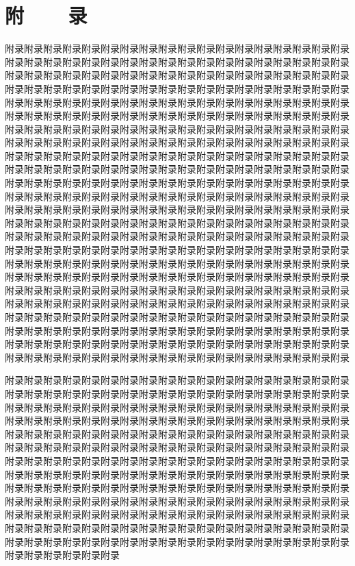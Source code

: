 \chapter*{附~~~~录}


附录附录附录附录附录附录附录附录附录附录附录附录附录附录附录附录附录附录附录附录附录附录附录附录附录附录附录附录附录附录附录附录附录附录附录附录附录附录附录附录附录附录附录附录附录附录附录附录附录附录附录附录附录附录附录附录附录附录附录附录附录附录附录附录附录附录附录附录附录附录附录附录附录附录附录附录附录附录附录附录附录附录附录附录附录附录附录附录附录附录附录附录附录附录附录附录附录附录附录附录附录附录附录附录附录附录附录附录附录附录附录附录附录附录附录附录附录附录附录附录附录附录附录附录附录附录附录附录附录附录附录附录附录附录附录附录附录附录附录附录附录附录附录附录附录附录附录附录附录附录附录附录附录附录附录附录附录附录附录附录附录附录附录附录附录附录附录附录附录附录附录附录附录附录附录附录附录附录附录附录附录附录附录附录附录附录附录附录附录附录附录附录附录附录附录附录附录附录附录附录附录附录附录附录附录附录附录附录附录附录附录附录附录附录附录附录附录附录附录附录附录附录附录附录附录附录附录附录附录附录附录附录附录附录附录附录附录附录附录附录附录附录附录附录附录附录附录附录附录附录附录附录附录附录附录附录附录附录附录附录附录附录附录附录附录附录附录附录附录附录附录附录附录附录附录附录附录附录附录附录附录附录附录附录附录附录附录附录附录附录附录附录附录附录附录附录附录附录附录附录附录附录附录附录附录附录附录附录附录附录附录附录附录附录附录附录附录附录附录附录附录附录附录附录附录附录附录附录附录附录附录附录附录附录附录附录附录附录附录附录附录附录附录附录附录附录附录附录附录附录附录附录附录附录附录附录附录附录附录附录附录附录附录附录附录附录附录附录附录附录附录附录附录附录附录附录附录附录附录附录附录附录附录附录附录附录附录附录附录附录附录附录附录附录附录附录附录附录附录附录附录附录附录附录附录附录附录附录附录附录附录附录附录附录附录附录附录附录附录附录附录附录附录附录附录附录附录附录附录附录附录附录

附录附录附录附录附录附录附录附录附录附录附录附录附录附录附录附录附录附录附录附录附录附录附录附录附录附录附录附录附录附录附录附录附录附录附录附录附录附录附录附录附录附录附录附录附录附录附录附录附录附录附录附录附录附录附录附录附录附录附录附录附录附录附录附录附录附录附录附录附录附录附录附录附录附录附录附录附录附录附录附录附录附录附录附录附录附录附录附录附录附录附录附录附录附录附录附录附录附录附录附录附录附录附录附录附录附录附录附录附录附录附录附录附录附录附录附录附录附录附录附录附录附录附录附录附录附录附录附录附录附录附录附录附录附录附录附录附录附录附录附录附录附录附录附录附录附录附录附录附录附录附录附录附录附录附录附录附录附录附录附录附录附录附录附录附录附录附录附录附录附录附录附录附录附录附录附录附录附录附录附录附录附录附录附录附录附录附录附录附录附录附录附录附录附录附录附录附录附录附录附录附录附录附录附录附录附录附录附录附录附录附录附录附录附录附录附录附录附录附录附录附录附录附录附录附录附录附录附录附录附录附录附录附录附录附录附录附录附录附录附录

